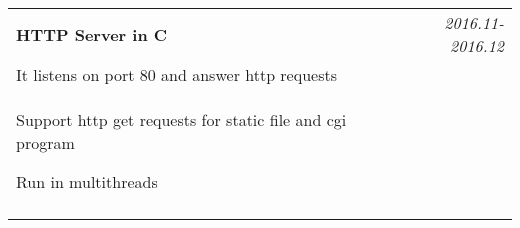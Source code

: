 \documentclass[a4paper,10pt]{article}
\begin{document}
\begin{tabular}{p{13.5cm}p{0.5cm}r}
\textbf{HTTP Server in C} && \emph{2016.11-2016.12} \\
\hspace{1em} It listens on port 80 and answer http requests && \vspace{-0.5em} \\
\begin{compactitem}
  \item Support http get requests for static file and cgi program\vspace{0.2em}
  \item Run in multithreads
\end{compactitem}&&\vspace{-2.2em} \\
\multicolumn{3}{c}{} \\



\end{tabular}


\end{document}
